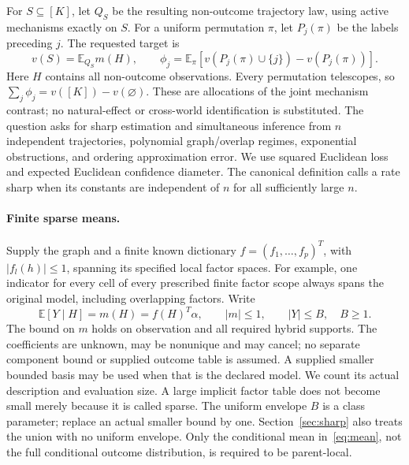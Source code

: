 \documentclass[11pt,a4paper]{article}
\numberwithin{equation}{section}
\theoremstyle{definition}
\newcommand{\E}{\mathbb E}
\begin{document}
For $S\subseteq[K]$, let $Q_S$ be the resulting non-outcome trajectory
law, using active mechanisms exactly on $S$. For a uniform permutation
$\pi$, let $P_j(\pi)$ be the labels preceding $j$. The requested target is
\begin{equation}\label{eq:target}
 v(S)=\E_{Q_S}m(H),\qquad
 \phi_j=\E_\pi[v(P_j(\pi)\cup\{j\})-v(P_j(\pi))].
\end{equation}
Here $H$ contains all non-outcome observations. Every permutation
telescopes, so $\sum_j\phi_j=v([K])-v(\varnothing)$. These are allocations
of the joint mechanism contrast; no natural-effect or cross-world
identification is substituted. The question asks for sharp estimation
and simultaneous inference from $n$ independent trajectories, polynomial
graph/overlap regimes, exponential obstructions, and ordering approximation
error. We use squared Euclidean loss and expected Euclidean confidence
diameter. The canonical definition calls a rate sharp when its constants
are independent of $n$ for all sufficiently large $n$.

\paragraph{Finite sparse means.}
Supply the graph and a finite known dictionary $f=(f_1,\ldots,f_p)^T$,
with $|f_l(h)|\le1$, spanning its specified local factor spaces. For example,
one indicator for every cell of every prescribed finite factor scope
always spans the original model, including overlapping factors. Write
\begin{equation}\label{eq:mean}
 \E[Y\mid H]=m(H)=f(H)^T\alpha,\qquad |m|\le1,
 \qquad |Y|\le B,\quad B\ge1.
\end{equation}
The bound on $m$ holds on observation and all required hybrid supports.
The coefficients are unknown, may be nonunique and may cancel; no separate
component bound or supplied outcome table is assumed. A supplied smaller
bounded basis may be used when that is the declared model. We count its
actual description and evaluation size. A large implicit factor table
does not become small merely because it is called sparse. The uniform
envelope $B$ is a class parameter; replace an actual smaller bound by one.
Section~\ref{sec:sharp} also treats the union with no uniform envelope.
Only the conditional mean in~\eqref{eq:mean}, not the full conditional
outcome distribution, is required to be parent-local.
\end{document}
